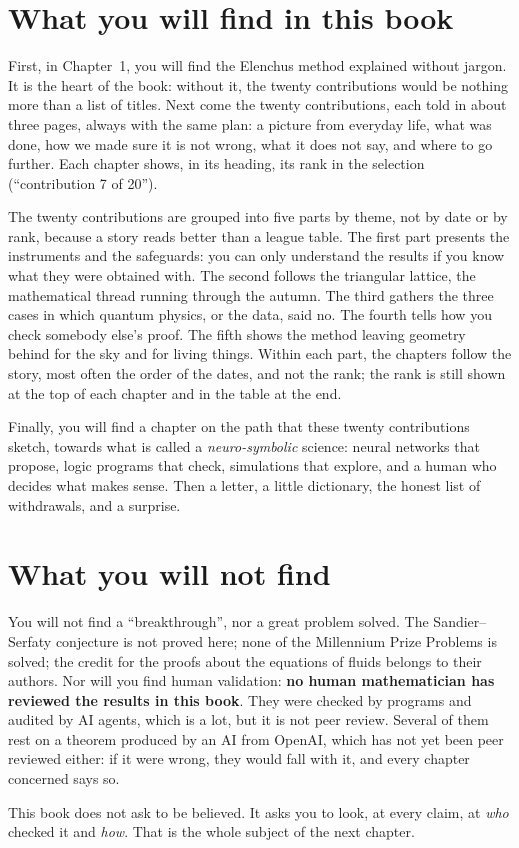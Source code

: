 \section{What you will find in this book}

First, in Chapter~1, you will find the Elenchus method explained without jargon. It is the heart of the book: without
it, the twenty contributions would be nothing more than a list of titles. Next come the twenty contributions, each
told in about three pages, always with the same plan: a picture from everyday life, what was done, how we made sure
it is not wrong, what it does not say, and where to go further. Each chapter shows, in its heading, its rank in the
selection (``contribution 7 of 20'').

The twenty contributions are grouped into five parts by theme, not by date or by rank, because a story reads better
than a league table. The first part presents the instruments and the safeguards: you can only understand the results
if you know what they were obtained with. The second follows the triangular lattice, the mathematical thread running
through the autumn. The third gathers the three cases in which quantum physics, or the data, said no. The fourth
tells how you check somebody else's proof. The fifth shows the method leaving geometry behind for the sky and for
living things. Within each part, the chapters follow the story, most often the order of the dates, and not the rank;
the rank is still shown at the top of each chapter and in the table at the end.

Finally, you will find a chapter on the path that these twenty contributions sketch, towards what is called a
\emph{neuro-symbolic} science: neural networks that propose, logic programs that check, simulations that explore, and
a human who decides what makes sense. Then a letter, a little dictionary, the honest list of withdrawals, and a
surprise.

\section{What you will not find}

You will not find a ``breakthrough'', nor a great problem solved. The Sandier--Serfaty conjecture is not proved here;
none of the Millennium Prize Problems is solved; the credit for the proofs about the equations of fluids belongs to
their authors. Nor will you find human validation: \textbf{no human mathematician has reviewed the results in this
book}. They were checked by programs and audited by AI agents, which is a lot, but it is not peer review. Several of
them rest on a theorem produced by an AI from OpenAI, which has not yet been peer reviewed either: if it were wrong, they
would fall with it, and every chapter concerned says so.

This book does not ask to be believed. It asks you to look, at every claim, at \emph{who} checked it and \emph{how}.
That is the whole subject of the next chapter.
